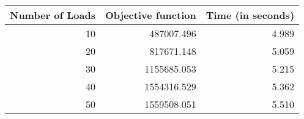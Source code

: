 \begin{tabular}{| r | r | r |}
  \hline 
  Number of Loads & Objective function & Time (in seconds) \\ 
  \hline \hline 
  10 & 487007.496 & 4.989 \\ \hline 
  20 & 817671.148 & 5.059 \\ \hline 
  30 & 1155685.053 & 5.215 \\ \hline 
  40 & 1554316.529 & 5.362 \\ \hline 
  50 & 1559508.051 & 5.510 \\ \hline 
\end{tabular}
